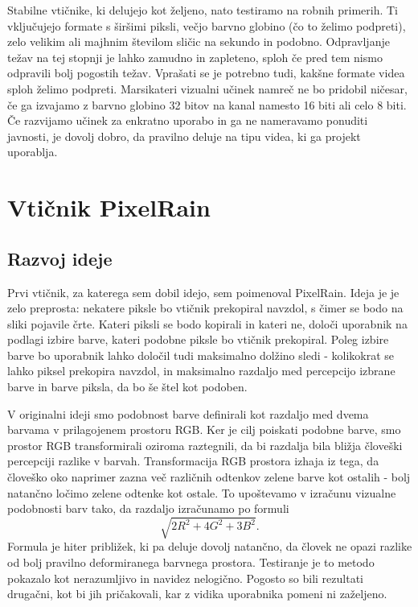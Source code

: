 \documentclass[a4paper, 12pt]{book}
\begin{document}
Stabilne vtičnike, ki delujejo kot željeno, nato testiramo na robnih primerih.
Ti vključujejo formate s širšimi piksli, večjo barvno globino (čo to želimo podpreti), zelo velikim ali majhnim številom sličic na sekundo in podobno.
Odpravljanje težav na tej stopnji je lahko zamudno in zapleteno, sploh če pred tem nismo odpravili bolj pogostih težav.
Vprašati se je potrebno tudi, kakšne formate videa sploh želimo podpreti.
Marsikateri vizualni učinek namreč ne bo pridobil ničesar, če ga izvajamo z barvno globino 32 bitov na kanal namesto 16 biti ali celo 8 biti.
Če razvijamo učinek za enkratno uporabo in ga ne nameravamo ponuditi javnosti, je dovolj dobro, da pravilno deluje na tipu videa, ki ga projekt uporablja.



\section{Vtičnik PixelRain}

\subsection{Razvoj ideje}
Prvi vtičnik, za katerega sem dobil idejo, sem poimenoval PixelRain. 
Ideja je je zelo preprosta: nekatere piksle bo vtičnik prekopiral navzdol, s čimer se bodo na sliki pojavile črte.
Kateri piksli se bodo kopirali in kateri ne, določi uporabnik na podlagi izbire barve, kateri podobne piksle bo vtičnik prekopiral.
Poleg izbire barve bo uporabnik lahko določil tudi maksimalno dolžino sledi - kolikokrat se lahko piksel prekopira navzdol,
in maksimalno razdaljo med percepcijo izbrane barve in barve piksla, da bo še štel kot podoben.

V originalni ideji smo podobnost barve definirali kot razdaljo med dvema barvama v prilagojenem prostoru RGB.
Ker je cilj poiskati podobne barve, smo prostor RGB transformirali oziroma raztegnili, da bi razdalja bila bližja človeški percepciji razlike v barvah.
Transformacija RGB prostora izhaja iz tega, da človeško oko naprimer zazna več različnih odtenkov zelene barve kot ostalih - bolj natančno ločimo zelene odtenke kot ostale.
To upoštevamo v izračunu vizualne podobnosti barv tako, da razdaljo izračunamo po formuli\cite{colordiff2} $$ \sqrt{ 2 R^2 + 4 G^2 + 3 B^2 } . $$ 
Formula je hiter približek, ki pa deluje dovolj natančno, da človek ne opazi razlike od bolj pravilno deformiranega barvnega prostora.
Testiranje je to metodo pokazalo kot nerazumljivo in navidez nelogično.
Pogosto so bili rezultati drugačni, kot bi jih pričakovali, kar z vidika uporabnika pomeni ni zaželjeno\cite{upoprogopr}.
\end{document}
